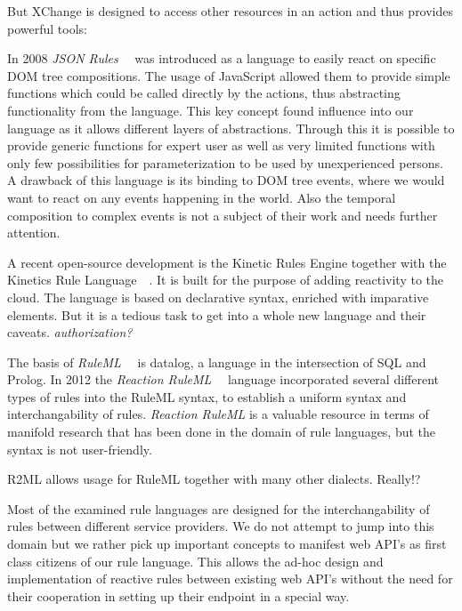 But XChange is designed to access other resources in an action and thus provides powerful tools:

In 2008 \emph{JSON Rules}~~\cite{2008-Giurca_Pascalau-JSON_Rules.pdf} was introduced as a language to easily react on specific DOM tree compositions.
The usage of JavaScript allowed them to provide simple functions which could be called directly by the actions, thus abstracting functionality from the language.
This key concept found influence into our language as it allows different layers of abstractions.
Through this it is possible to provide generic functions for expert user as well as very limited functions with only few possibilities for parameterization to be used by unexperienced persons.
A drawback of this language is its binding to DOM tree events, where we would want to react on any events happening in the world.
Also the temporal composition to complex events is not a subject of their work and needs further attention.


A recent open-source development is the Kinetic Rules Engine together with the Kinetics Rule Language~~\cite{bookTheLiveWeb}.
It is built for the purpose of adding reactivity to the cloud.
The language is based on declarative syntax, enriched with imparative elements.
But it is a tedious task to get into a whole new language and their caveats.
\emph{authorization?}


The basis of \emph{RuleML}~~\cite{2006-Boley-RuleML.pdf} is datalog, a language in the intersection of SQL and Prolog.
In 2012 the \emph{Reaction RuleML}~~\cite{2012-Paschke_etal-ReactionRuleML.pdf} language incorporated several different types of rules into the RuleML syntax, to establish a uniform syntax and interchangability of rules.
\emph{Reaction RuleML} is a valuable resource in terms of manifold research that has been done in the domain of rule languages, but the syntax is not user-friendly.


R2ML allows usage for RuleML together with many other dialects. Really!?


Most of the examined rule languages are designed for the interchangability of rules between different service providers. We do not attempt to jump into this domain but we rather pick up important concepts to manifest web API's as first class citizens of our rule language. This allows the ad-hoc design and implementation of reactive rules between existing web API's without the need for their cooperation in setting up their endpoint in a special way.



